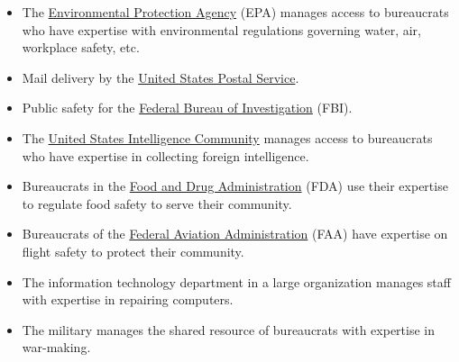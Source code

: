   \begin{itemize}
      \item The \href{https://en.wikipedia.org/wiki/United_States_Environmental_Protection_Agency}{Environmental Protection Agency} (EPA) manages access to bureaucrats who have expertise with environmental regulations governing water, air, workplace safety, etc.

      \item Mail delivery by the \href{https://en.wikipedia.org/wiki/United_States_Postal_Service}{United States Postal Service}.
%
\iftoggle{WPinmargin}{\marginpar{$>$Wikipedia: USPS}}{}

      \item Public safety for the \href{https://en.wikipedia.org/wiki/Federal_Bureau_of_Investigation}{Federal Bureau of Investigation} (FBI).
%
%

      \item The \href{https://www.intelligence.gov/}{United States Intelligence Community} manages access to bureaucrats who have expertise in collecting foreign intelligence.

      \item Bureaucrats in the \href{https://www.fda.gov/}{Food and Drug Administration} (FDA) use their expertise to regulate food safety to serve their community.


      \item Bureaucrats of the \href{https://www.faa.gov/}{Federal Aviation Administration} (FAA) have expertise on flight safety to protect their community.


      \item The information technology department in a large organization manages staff with expertise in repairing computers.%
      \item The military manages the shared resource of bureaucrats with expertise in war-making.
  \end{itemize}

